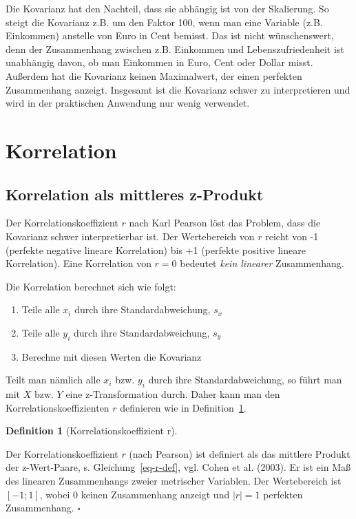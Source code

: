 \documentclass[
  letterpaper,
]{scrbook}
\providecommand{\tightlist}{%
  \setlength{\itemsep}{0pt}\setlength{\parskip}{0pt}}\usepackage{longtable,booktabs,array}
\theoremstyle{definition}
\theoremstyle{definition}
\newtheorem{definition}{Definition}[chapter]
\theoremstyle{definition}
\theoremstyle{remark}
\begin{document}
Die Kovarianz hat den Nachteil, dass sie abhängig ist von der
Skalierung. So steigt die Kovarianz z.B. um den Faktor 100, wenn man
eine Variable (z.B. Einkommen) anstelle von Euro in Cent bemisst. Das
ist nicht wünschenswert, denn der Zusammenhang zwischen z.B. Einkommen
und Lebenszufriedenheit ist unabhängig davon, ob man Einkommen in Euro,
Cent oder Dollar misst. Außerdem hat die Kovarianz keinen Maximalwert,
der einen perfekten Zusammenhang anzeigt. Insgesamt ist die Kovarianz
schwer zu interpretieren und wird in der praktischen Anwendung nur wenig
verwendet.

\section{Korrelation}\label{korrelation}

\subsection{Korrelation als mittleres
z-Produkt}\label{korrelation-als-mittleres-z-produkt}

Der Korrelationskoeffizient \(r\) nach Karl Pearson löst das Problem,
dass die Kovarianz schwer interpretierbar ist. Der Wertebereich von
\(r\) reicht von -1 (perfekte negative lineare Korrelation) bis +1
(perfekte positive lineare Korrelation). Eine Korrelation von \(r = 0\)
bedeutet \emph{kein linearer} Zusammenhang.

Die Korrelation berechnet sich wie folgt:

\begin{enumerate}
\def\labelenumi{\arabic{enumi}.}
\tightlist
\item
  Teile alle \(x_i\) durch ihre Standardabweichung, \(s_x\)
\item
  Teile alle \(y_i\) durch ihre Standardabweichung, \(s_y\)
\item
  Berechne mit diesen Werten die Kovarianz
\end{enumerate}

Teilt man nämlich alle \(x_i\) bzw. \(y_i\) durch ihre
Standardabweichung, so führt man mit \(X\) bzw. \(Y\) eine
z-Transformation durch. Daher kann man den Korrelationskoeffizienten
\(r\) definieren wie in Definition~\ref{def-r}.

\begin{definition}[Korrelationskoeffizient
r]\protect\hypertarget{def-r}{}\label{def-r}

Der Korrelationskoeffizient \(r\) (nach Pearson) ist definiert als das
mittlere Produkt der z-Wert-Paare, s. Gleichung~\ref{eq-r-def}, vgl.
Cohen et al. (2003). Er ist ein Maß des linearen Zusammenhangs zweier
metrischer Variablen. Der Wertebereich ist \([-1;1]\), wobei 0 keinen
Zusammenhang anzeigt und \(|r|=1\) perfekten Zusammenhang. \(\square\)

\end{definition}
\end{document}
